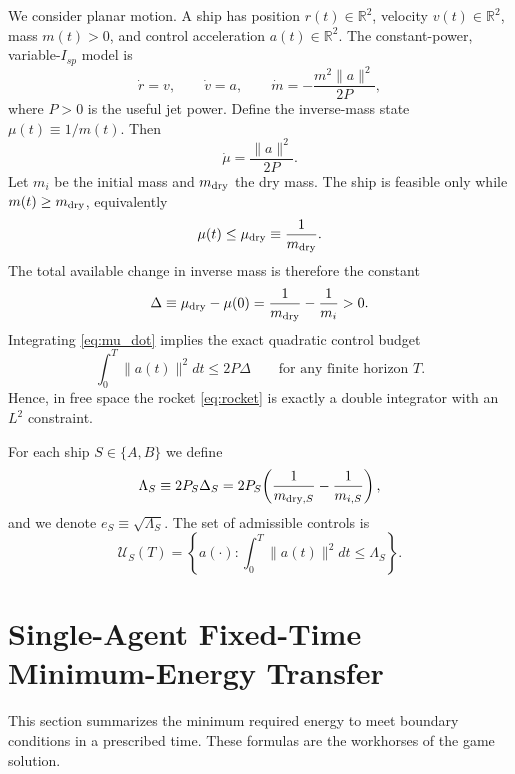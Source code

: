 \documentclass[journal, a4paper]{IEEEtran}
\begin{document}
We consider planar motion. A ship has position $r(t)\in\mathbb{R}^2$, velocity $v(t)\in\mathbb{R}^2$, mass $m(t)>0$, and control acceleration $a(t)\in\mathbb{R}^2$.
The constant-power, variable-$I_{\!sp}$ model is
\begin{equation}
\dot r = v,\qquad
\dot v = a,\qquad
\dot m = -\frac{m^2\|a\|^2}{2P},
\label{eq:rocket}
\end{equation}
where $P>0$ is the useful jet power.
Define the inverse-mass state $\mu(t)\equiv 1/m(t)$. Then
\begin{equation}
\dot\mu = \frac{\|a\|^2}{2P}.
\label{eq:mu_dot}
\end{equation}
Let $m_i$ be the initial mass and $m_{\rm dry}$ the dry mass. The ship is feasible only while $m(t)\ge m_{\rm dry}$, equivalently
\begin{equation}
\mu(t)\le \mu_{\rm dry}\equiv \frac{1}{m_{\rm dry}}.
\end{equation}
The total available change in inverse mass is therefore the constant
\begin{equation}
\Delta \equiv \mu_{\rm dry}-\mu(0) = \frac{1}{m_{\rm dry}}-\frac{1}{m_i}>0.
\label{eq:Delta_def}
\end{equation}
Integrating \eqref{eq:mu_dot} implies the exact quadratic control budget
\begin{equation}
\int_0^{T} \|a(t)\|^2 dt \le 2P\Delta
\qquad\text{for any finite horizon $T$.}
\label{eq:L2_budget}
\end{equation}
Hence, in free space the rocket \eqref{eq:rocket} is exactly a double integrator with an $L^2$ constraint.

For each ship $S\in\{A,B\}$ we define
\begin{equation}
\Lambda_S \equiv 2P_S\Delta_S
= 2P_S\!\left(\frac{1}{m_{{\rm dry},S}}-\frac{1}{m_{i,S}}\right),
\label{eq:Lambda_def}
\end{equation}
and we denote $e_S\equiv \sqrt{\Lambda_S}$.
The set of admissible controls is
\begin{equation}
\mathcal{U}_S(T)=\left\{a(\cdot): \int_0^T \|a(t)\|^2dt \le \Lambda_S\right\}.
\end{equation}

\section{Single-Agent Fixed-Time Minimum-Energy Transfer}
\label{sec:single_agent}

This section summarizes the minimum required energy to meet boundary conditions in a prescribed time. These formulas are the workhorses of the game solution.
\end{document}
